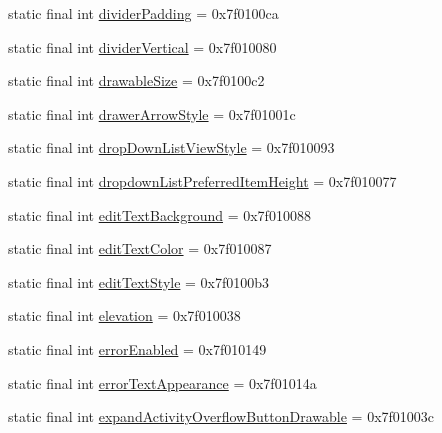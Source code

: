 \begin{CompactItemize}
\item 
static final int \hyperlink{classandroid_1_1support_1_1v7_1_1palette_1_1_r_1_1attr_5d67920c88de6ec165597d4870ce6e52}{dividerPadding} = 0x7f0100ca
\item 
static final int \hyperlink{classandroid_1_1support_1_1v7_1_1palette_1_1_r_1_1attr_4f5ecb2477b9bc708dd8cc0c8ce05c9b}{dividerVertical} = 0x7f010080
\item 
static final int \hyperlink{classandroid_1_1support_1_1v7_1_1palette_1_1_r_1_1attr_825d54398676292cc2c09cd547800157}{drawableSize} = 0x7f0100c2
\item 
static final int \hyperlink{classandroid_1_1support_1_1v7_1_1palette_1_1_r_1_1attr_1c3cdc27a7c2e3f5148a0494e6d3beeb}{drawerArrowStyle} = 0x7f01001c
\item 
static final int \hyperlink{classandroid_1_1support_1_1v7_1_1palette_1_1_r_1_1attr_70723506508d2492cc444e6b1e20a0a9}{dropDownListViewStyle} = 0x7f010093
\item 
static final int \hyperlink{classandroid_1_1support_1_1v7_1_1palette_1_1_r_1_1attr_e1a3f6e0b531bb53973f37194f94f893}{dropdownListPreferredItemHeight} = 0x7f010077
\item 
static final int \hyperlink{classandroid_1_1support_1_1v7_1_1palette_1_1_r_1_1attr_d5ca95fd5920d3810abf67f0049d1ee0}{editTextBackground} = 0x7f010088
\item 
static final int \hyperlink{classandroid_1_1support_1_1v7_1_1palette_1_1_r_1_1attr_6ba62f0f21f3354f591614734ba80bbe}{editTextColor} = 0x7f010087
\item 
static final int \hyperlink{classandroid_1_1support_1_1v7_1_1palette_1_1_r_1_1attr_c6fb67b1dec715171b248dd15bcb0132}{editTextStyle} = 0x7f0100b3
\item 
static final int \hyperlink{classandroid_1_1support_1_1v7_1_1palette_1_1_r_1_1attr_0b5f7c979ac70d0ddb4742bc53015985}{elevation} = 0x7f010038
\item 
static final int \hyperlink{classandroid_1_1support_1_1v7_1_1palette_1_1_r_1_1attr_7b05071a27c855624ea2b4789d204931}{errorEnabled} = 0x7f010149
\item 
static final int \hyperlink{classandroid_1_1support_1_1v7_1_1palette_1_1_r_1_1attr_9009690fbe8f0aa6ccc6d702b46be3c1}{errorTextAppearance} = 0x7f01014a
\item 
static final int \hyperlink{classandroid_1_1support_1_1v7_1_1palette_1_1_r_1_1attr_84fb3f294aef86590a122f53d6d5dd0e}{expandActivityOverflowButtonDrawable} = 0x7f01003c
\item 

\end{CompactItemize}
